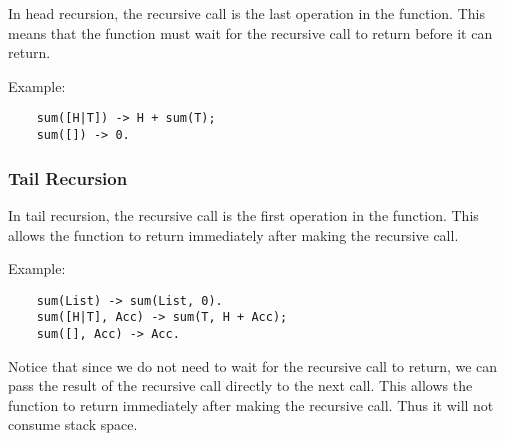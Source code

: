 In head recursion, the recursive call is the last operation in the function. This means that the function must wait for the recursive call to return before it can return.

Example:
\begin{verbatim}
    sum([H|T]) -> H + sum(T);
    sum([]) -> 0.
\end{verbatim}

\subsubsection{Tail Recursion}

In tail recursion, the recursive call is the first operation in the function. This allows the function to return immediately after making the recursive call.

Example:
\begin{verbatim}
    sum(List) -> sum(List, 0).
    sum([H|T], Acc) -> sum(T, H + Acc);
    sum([], Acc) -> Acc.
\end{verbatim}

Notice that since we do not need to wait for the recursive call to return, we can pass the result of the recursive call directly to the next call. This allows the function to return immediately after making the recursive call. Thus it will not consume stack space.